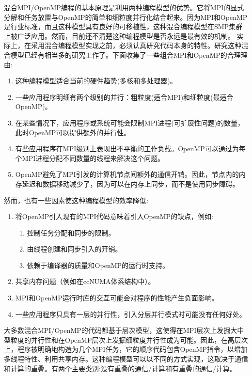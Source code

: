 混合MPI/OpenMP编程的基本原理是利用两种编程模型的优势。它将MPI的显式分解和任务放置与OpenMP的简单和细粒度并行化结合起来。因为MPI和OpenMP是行业标准，而且这种模型具有良好的可移植性，这种混合编程模型在SMP集群上被广泛应用。然而，目前还不清楚这种编程模型是否永远是最有效的机制。 实际上，在采用混合编程模型实现之前，必须认真研究代码本身的特性。研究这种混合模型已经有相当多的研究工作了\citep{smith2001development, rabenseifner2003hybrid, estrade2009hybrid}。下面收集了一些组合MPI和OpenMP的合理理由:

\begin{enumerate}
	\item 这种编程模型适合当前的硬件趋势(多核和多处理器)。
	\item 一些应用程序明细有两个级别的并行：粗粒度(适合MPI)和细粒度(最适合OpenMP)。
	\item 在某些情况下，应用程序或系统可能会限制MPI进程(可扩展性问题)的数量，此时OpenMP可以提供额外的并行性。
	\item 有些应用程序在MPI级别上表现出不平衡的工作负载。OpenMP可以通过为每个MPI进程分配不同数量的线程来解决这个问题。
	\item OpenMP避免了MPI引发的计算机节点间额外的通信开销。因此，节点内的内存延迟和数据移动减少了，因为可以在内存上同步，而不是使用同步障碍。
\end{enumerate}

然而，也有一些因素使这种编程模型的效率降低:

\begin{enumerate}
	\item 将OpenMP引入现有的MPI代码意味着引入OpenMP的缺点，例如:
		\begin{enumerate}
			\item 控制任务分配和同步的限制。
			\item 由线程创建和同步引入的开销。
			\item 依赖于编译器的质量和OpenMP的运行时支持。
		\end{enumerate}
	\item 共享内存问题（例如在ccNUMA体系结构中）。
	\item MPI和OpenMP运行时库的交互可能会对程序的性能产生负面影响。
	\item 一些应用程序只具有一层的并行性，引入分层并行模式时可能没有任何好处。
\end{enumerate}

大多数混合MPI/OpenMP的代码都基于层次模型，这使得在MPI层次上发掘大中型粒度的并行性和在OpenMP层次上发掘细粒度并行性成为可能。因此，在高层次上，程序被明确地构造为几个MPI任务，它的顺序代码包含OpenMP指令，以增加多线程特性、利用共享内存。这种编程模型可以以不同的方式实现，这取决于通信和计算的重叠\citep{rabenseifner2003hybrid}。有两个主要类别:没有重叠的通信/计算和有重叠的通信/计算。
  
